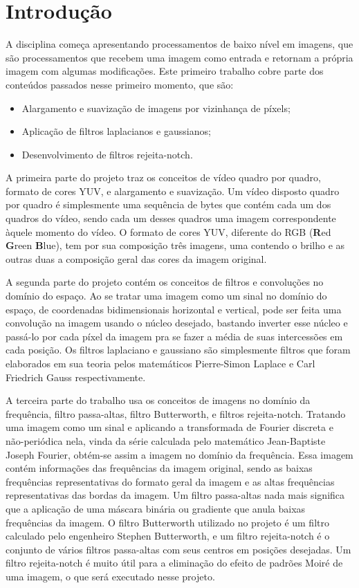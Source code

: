 \documentclass[conference]{IEEEtran}
\begin{document}
\section{Introdução}

A disciplina começa apresentando processamentos de baixo nível em imagens, que são processamentos que recebem uma imagem como entrada e retornam a própria imagem com algumas modificações. Este primeiro trabalho cobre parte dos conteúdos passados nesse primeiro momento, que são:

\begin{itemize}
    \item Alargamento e suavização de imagens por vizinhança de píxels;
    \item Aplicação de filtros laplacianos e gaussianos;
    \item Desenvolvimento de filtros rejeita-notch.
\end{itemize}

A primeira parte do projeto traz os conceitos de vídeo quadro por quadro, formato de cores YUV, e alargamento e suavização. Um vídeo disposto quadro por quadro é simplesmente uma sequência de bytes que contém cada um dos quadros do vídeo, sendo cada um desses quadros uma imagem correspondente àquele momento do vídeo. O formato de cores YUV, diferente do RGB (\textbf{R}ed \textbf{G}reen \textbf{B}lue), tem por sua composição três imagens, uma contendo o brilho e as outras duas a composição geral das cores da imagem original.

A segunda parte do projeto contém os conceitos de filtros e convoluções no domínio do espaço. Ao se tratar uma imagem como um sinal no domínio do espaço, de coordenadas bidimensionais horizontal e vertical, pode ser feita uma convolução na imagem usando o núcleo desejado, bastando inverter esse núcleo e passá-lo por cada píxel da imagem pra se fazer a média de suas intercessões em cada posição. Os filtros laplaciano e gaussiano são simplesmente filtros que foram elaborados em sua teoria pelos matemáticos Pierre-Simon Laplace e Carl Friedrich Gauss respectivamente.

A terceira parte do trabalho usa os conceitos de imagens no domínio da frequência, filtro passa-altas, filtro Butterworth, e filtros rejeita-notch. Tratando uma imagem como um sinal e aplicando a transformada de Fourier discreta e não-periódica nela, vinda da série calculada pelo matemático Jean-Baptiste Joseph Fourier, obtém-se assim a imagem no domínio da frequência. Essa imagem contém informações das frequências da imagem original, sendo as baixas frequências representativas do formato geral da imagem e as altas frequências representativas das bordas da imagem. Um filtro passa-altas nada mais significa que a aplicação de uma máscara binária ou gradiente que anula baixas frequências da imagem. O filtro Butterworth utilizado no projeto é um filtro calculado pelo engenheiro Stephen Butterworth, e um filtro rejeita-notch é o conjunto de vários filtros passa-altas com seus centros em posições desejadas. Um filtro rejeita-notch é muito útil para a eliminação do efeito de padrões Moiré de uma imagem, o que será executado nesse projeto.
\end{document}
